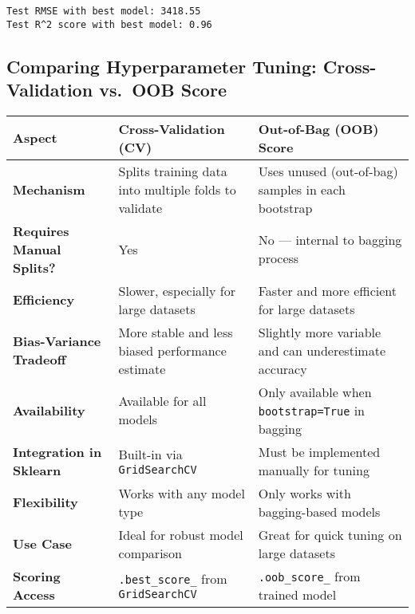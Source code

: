 \documentclass[
  letterpaper,
  DIV=11,
  numbers=noendperiod]{scrreprt}
\begin{document}
\begin{verbatim}
Test RMSE with best model: 3418.55
Test R^2 score with best model: 0.96
\end{verbatim}

\subsection{Comparing Hyperparameter Tuning: Cross-Validation vs.~OOB
Score}\label{comparing-hyperparameter-tuning-cross-validation-vs.-oob-score}

\begin{longtable}[]{@{}
  >{\raggedright\arraybackslash}p{}
  >{\raggedright\arraybackslash}p{}
  >{\raggedright\arraybackslash}p{}@{}}
\toprule\noalign{}
\begin{minipage}[b]{\linewidth}\raggedright
Aspect
\end{minipage} & \begin{minipage}[b]{\linewidth}\raggedright
Cross-Validation (CV)
\end{minipage} & \begin{minipage}[b]{\linewidth}\raggedright
Out-of-Bag (OOB) Score
\end{minipage} \\
\midrule\noalign{}
\endhead
\bottomrule\noalign{}
\endlastfoot
\textbf{Mechanism} & Splits training data into multiple folds to
validate & Uses unused (out-of-bag) samples in each bootstrap \\
\textbf{Requires Manual Splits?} & Yes & No --- internal to bagging
process \\
\textbf{Efficiency} & Slower, especially for large datasets & Faster and
more efficient for large datasets \\
\textbf{Bias-Variance Tradeoff} & More stable and less biased
performance estimate & Slightly more variable and can underestimate
accuracy \\
\textbf{Availability} & Available for all models & Only available when
\texttt{bootstrap=True} in bagging \\
\textbf{Integration in Sklearn} & Built-in via \texttt{GridSearchCV} &
Must be implemented manually for tuning \\
\textbf{Flexibility} & Works with any model type & Only works with
bagging-based models \\
\textbf{Use Case} & Ideal for robust model comparison & Great for quick
tuning on large datasets \\
\textbf{Scoring Access} & \texttt{.best\_score\_} from
\texttt{GridSearchCV} & \texttt{.oob\_score\_} from trained model \\
\end{longtable}
\end{document}
